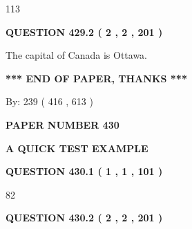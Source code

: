 \documentclass[12pt]{article}
\begin{document}
113
 
 
  
\vspace{0.2in}
  
{\textbf{\Large{QUESTION
429.2 
 ( 2 , 2 , 201 )
}}}
  
  
 
 
\noindent{}
 
 
The capital of Canada is Ottawa.
 
 
 
 
   
   
 \vspace{0.2in}
 
   
   
   
   
\vspace{1.0in} 
{\textbf{\large{ *** END OF PAPER, THANKS *** }}} 
   
   
\hspace{1.0in} By: 
 239 ( 416 ,  613 )
   
   
   
   
\newpage 
\setcounter{page}{ 
   430001 } 
   
   
   
   
 {\textbf{ \Large{ PAPER NUMBER  430  }}}
   
   
\vspace{0.2in}
   
   
   
   
   
   
 \vspace{0.2in}
{\LARGE {\textbf{ A QUICK TEST EXAMPLE}}}
   
   
  
\vspace{0.2in}
  
{\textbf{\Large{QUESTION
430.1 
 ( 1 , 1 , 101 )
}}}
  
  
 
 
\noindent{}

82
 
 
  
\vspace{0.2in}
  
{\textbf{\Large{QUESTION
430.2 
 ( 2 , 2 , 201 )
}}}
  
\end{document}
